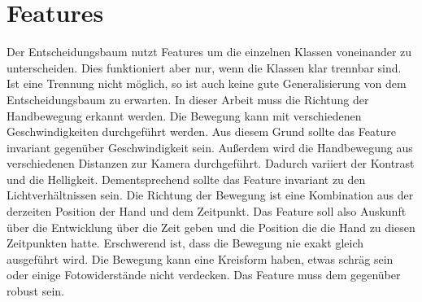 \section{Features}
Der Entscheidungsbaum nutzt Features um die einzelnen Klassen voneinander zu unterscheiden. Dies funktioniert aber nur, wenn die Klassen klar trennbar sind. Ist eine Trennung nicht möglich, so ist
auch keine gute Generalisierung von dem Entscheidungsbaum zu erwarten.
\newline
\newline
In dieser Arbeit muss die Richtung der Handbewegung erkannt werden. Die Bewegung kann mit verschiedenen Geschwindigkeiten durchgeführt werden. Aus diesem Grund sollte das Feature invariant
gegenüber Geschwindigkeit sein. Außerdem wird die Handbewegung aus verschiedenen Distanzen zur Kamera durchgeführt. Dadurch variiert der Kontrast und die Helligkeit.
Dementsprechend sollte das Feature invariant zu den Lichtverhältnissen sein. Die Richtung der Bewegung ist eine Kombination aus der derzeiten Position der Hand und dem Zeitpunkt. Das Feature soll
also Auskunft über die Entwicklung über die Zeit geben und die Position die die Hand zu diesen Zeitpunkten hatte.
\newline
\newline
Erschwerend ist, dass die Bewegung nie exakt gleich ausgeführt wird. Die Bewegung kann eine Kreisform haben, etwas schräg sein oder einige Fotowiderstände nicht verdecken. Das Feature muss dem gegenüber
robust sein.



\iffalse
* Manuelle Feature selection (TODO: Lieber bei features rein?) @Diskussion => Hirarchisch?
* RandomForest und ExtraTree machen das schon
* Eigentlich sind unsere Featuresets keine Featuresets sondern einzelne Feature
\fi
